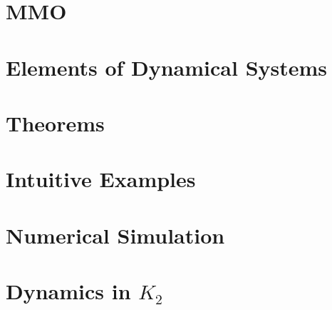 \documentclass{article}
\begin{document}
\section{MMO}\label{sec: MMO Oscilaltions}


\newpage 


\nocite{strogatz2007nonlinear}

\newpage
\appendix
\section{Elements of Dynamical Systems}\label{app:DynSys}

\section{Theorems}

\section{Intuitive Examples}\label{sec:definitions}%

\section{Numerical Simulation}\label{app:NumSim}
 
\section{Dynamics in \texorpdfstring{$K_2$}{K2}}
\end{document}
